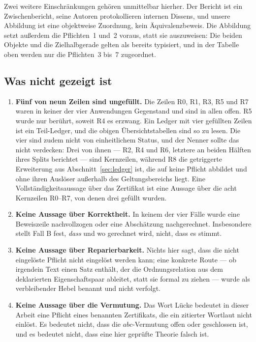 \documentclass[11pt,a4paper]{article}
\theoremstyle{definition}
\begin{document}
Zwei weitere Einschränkungen gehören unmittelbar hierher. Der Bericht ist ein
Zwischenbericht, seine Autoren protokollieren internen Dissens, und unsere
Abbildung ist eine objektweise Zuordnung, kein Äquivalenzbeweis. Die Abbildung
setzt außerdem die Pflichten~1 und~2 voraus, statt sie auszuweisen: Die beiden
Objekte und die Zielhalbgerade gelten als bereits typisiert, und in der Tabelle
oben werden nur die Pflichten~3 bis~7 zugeordnet.

\subsection{Was nicht gezeigt ist}

\begin{enumerate}
\item \textbf{Fünf von neun Zeilen sind ungefüllt.} Die Zeilen R0, R1, R3, R5 und
  R7 waren in keiner der vier Anwendungen Gegenstand und sind in allen offen. R5
  wurde nur berührt, soweit R4 es erzwang. Ein Ledger mit vier gefüllten Zeilen
  ist ein Teil-Ledger, und die obigen Übersichtstabellen sind so zu lesen. Die
  vier sind zudem nicht von einheitlichem Status, und der Nenner sollte das nicht
  verdecken: Drei von ihnen --- R2, R4 und R6, letztere an beiden Hälften ihres
  Splits berichtet --- sind Kernzeilen, während R8 die getriggerte Erweiterung
  aus Abschnitt~\ref{sec:ledger} ist, die auf keine Pflicht abbildet und ohne
  ihren Auslöser außerhalb des Geltungsbereichs liegt. Eine Vollständigkeitsaussage
  über das Zertifikat ist eine Aussage über die acht Kernzeilen R0--R7, von denen
  drei gefüllt wurden.
\item \textbf{Keine Aussage über Korrektheit.} In keinem der vier Fälle wurde eine
  Beweiszeile nachvollzogen oder eine Abschätzung nachgerechnet. Insbesondere
  stellt Fall B fest, \emph{dass} und wo gerechnet wird, nicht, dass es stimmt.
\item \textbf{Keine Aussage über Reparierbarkeit.} Nichts hier sagt, dass die
  nicht eingelöste Pflicht nicht eingelöst werden kann; eine konkrete Route ---
  ob irgendein Text einen Satz enthält, der die Ordnungsrelation aus dem
  deklarierten Eigenschaftspaar ableitet, statt sie formal zu ziehen --- wurde als
  verbleibender Hebel benannt und nicht verfolgt.
\item \textbf{Keine Aussage über die Vermutung.} Das Wort \glqq Lücke\grqq{} bedeutet in
  dieser Arbeit \glqq eine Pflicht eines benannten Zertifikats, die ein zitierter
  Wortlaut nicht einlöst\grqq. Es bedeutet nicht, dass die $abc$-Vermutung offen oder
  geschlossen ist, und es bedeutet nicht, dass eine hier geprüfte Theorie falsch
  ist.
\end{enumerate}
\end{document}
